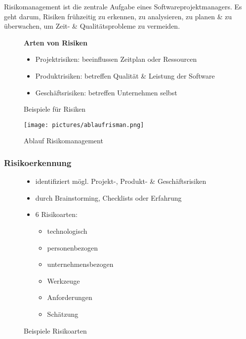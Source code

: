 \documentclass[12pt,a4paper,oneside]{article}
\begin{document}
Risikomanagement ist die zentrale Aufgabe eines Softwareprojektmanagers. Es geht darum, Risiken frühzeitig zu erkennen, zu analysieren, zu planen \& zu überwachen, um Zeit- \& Qualitätsprobleme zu vermeiden. \\

\begin{figure}[H]
\begin{minipage}[t]{0.45\textwidth}
\textbf{Arten von Risiken}
\begin{itemize}
\item Projektrisiken: beeinflussen Zeitplan oder Ressourcen
\item Produktrisiken: betreffen Qualität \& Leistung der Software
\item Geschäftsrisiken: betreffen Unternehmen selbst
\end{itemize}
\end{minipage}
\hfill
\begin{minipage}[t]{0.45\textwidth}
\centering
\vspace{-10mm}
\caption{Beispiele für Risiken}
\end{minipage}
\end{figure}

\begin{figure}[H]
\centering
\texttt{[image: pictures/ablaufrisman.png]}
\caption{Ablauf Risikomanagement}
\end{figure}

\subsubsection{Risikoerkennung}

\begin{figure}[H]
\begin{minipage}[t]{0.45\textwidth}
\begin{itemize}
\item identifiziert mögl. Projekt-, Produkt- \& Geschäftsrisiken
\item durch Brainstorming, Checklists oder Erfahrung
\item 6 Risikoarten:
\begin{itemize}
\item technologisch
\item personenbezogen
\item unternehmensbezogen
\item Werkzeuge
\item Anforderungen
\item Schätzung
\end{itemize}
\end{itemize}
\end{minipage}
\hfill
\begin{minipage}[t]{0.45\textwidth}
\centering
\vspace{0mm}
\caption{Beispiele Risikoarten}
\end{minipage}
\end{figure}
\end{document}
